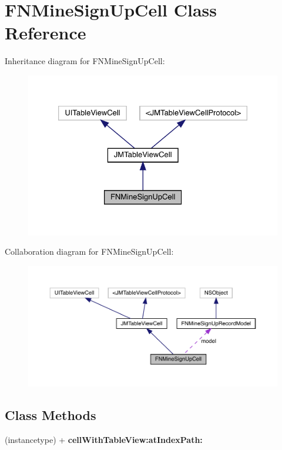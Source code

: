 \hypertarget{interface_f_n_mine_sign_up_cell}{}\section{F\+N\+Mine\+Sign\+Up\+Cell Class Reference}
\label{interface_f_n_mine_sign_up_cell}


Inheritance diagram for F\+N\+Mine\+Sign\+Up\+Cell\+:\nopagebreak
\begin{figure}[H]
\begin{center}
\leavevmode
\includegraphics[width=326pt]{interface_f_n_mine_sign_up_cell__inherit__graph}
\end{center}
\end{figure}


Collaboration diagram for F\+N\+Mine\+Sign\+Up\+Cell\+:\nopagebreak
\begin{figure}[H]
\begin{center}
\leavevmode
\includegraphics[width=350pt]{interface_f_n_mine_sign_up_cell__coll__graph}
\end{center}
\end{figure}
\subsection*{Class Methods}
\begin{DoxyCompactItemize}
\item 
\mbox{\label{interface_f_n_mine_sign_up_cell_a648b599a9e8badbb8d83978afb47bc78}} 
(instancetype) + {\bfseries cell\+With\+Table\+View\+:at\+Index\+Path\+:}
\end{DoxyCompactItemize}
